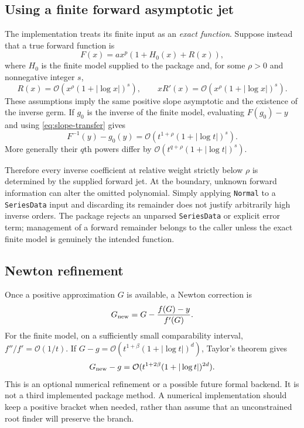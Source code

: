 \documentclass[11pt,a4paper]{article}
\numberwithin{equation}{section}
\theoremstyle{definition}\newtheorem{definition}[theorem]{Definition}
\theoremstyle{remark}\newtheorem{remark}[theorem]{Remark}
\newcommand{\OO}{\mathcal O}\newcommand{\dd}{\mathrm d}
\newcommand{\code}[1]{\texttt{#1}}
\begin{document}
\subsection{Using a finite forward asymptotic jet}

The implementation treats its finite input as an \emph{exact function}.
Suppose instead that a true forward function is
\[
 F(x)=a x^p(1+H_0(x)+R(x)),
\]
where $H_0$ is the finite model supplied to the package and, for some
$\rho>0$ and nonnegative integer $s$,
\begin{equation}
 R(x)=\OO(x^\rho(1+|\log x|)^s),\qquad
 xR'(x)=\OO(x^\rho(1+|\log x|)^s).
 \label{eq:forward-remainder}
\end{equation}
These assumptions imply the same positive slope asymptotic and the
existence of the inverse germ. If $g_0$ is the inverse of the finite
model, evaluating $F(g_0)-y$ and using \cref{eq:slope-transfer} gives
\begin{equation}
 F^{-1}(y)-g_0(y)
 =\OO(t^{1+\rho}(1+|\log t|)^s).
 \label{eq:jet-stability}
\end{equation}
More generally their $q$th powers differ by
$\OO(t^{q+\rho}(1+|\log t|)^s)$.

Therefore every inverse coefficient at relative weight strictly below
$\rho$ is determined by the supplied forward jet. At the boundary,
unknown forward information can alter the omitted polynomial. Simply
applying \code{Normal} to a \code{SeriesData} input and discarding its
remainder does not justify arbitrarily high inverse orders. The package
rejects an unparsed \code{SeriesData} or explicit error term; management
of a forward remainder belongs to the caller unless the exact finite
model is genuinely the intended function.

\subsection{Newton refinement}

Once a positive approximation $G$ is available, a Newton correction is
\[
 G_{\rm new}=G-\frac{f(G)-y}{f'(G)}.
\]
For the finite model, on a sufficiently small comparability interval,
$f''/f'=\OO(1/t)$. If
$G-g=\OO(t^{1+\beta}(1+|\log t|)^d)$, Taylor's theorem gives
\[
 G_{\rm new}-g=\OO(t^{1+2\beta}(1+|\log t|)^{2d}).
\]
This is an optional numerical refinement or a possible future formal
backend. It is not a third implemented package method. A numerical
implementation should keep a positive bracket when needed, rather than
assume that an unconstrained root finder will preserve the branch.
\end{document}
